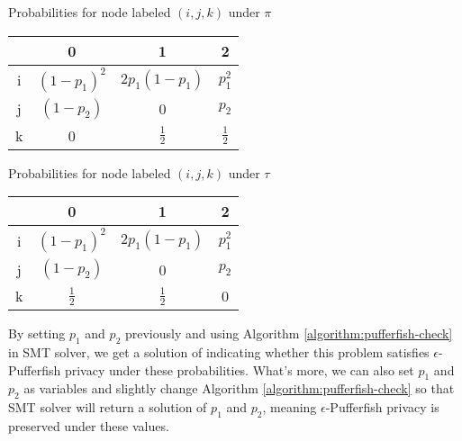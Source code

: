 \begin{minipage}{\textwidth}
\begin{minipage}[t]{0.4\textwidth}
 \centering
  \makeatletter{}\makeatother\caption{Probabilities for node labeled $(i,j,k)$ under $\pi$ }
  \label{table:pi}
   \begin{tabular}{c|ccc}
& 0 & 1 & 2 \\
      \hline
      i
      & $(1-p_1)^2$
      & $2p_1(1-p_1)$
      & $p_1^2$
      \\
      j
      & $(1-p_2)$
      & 0
      & $p_2$
      \\
      k
      & 0
      & $\frac{1}{2}$
      & $\frac{1}{2}$
\end{tabular}
\end{minipage}
\begin{minipage}[t]{0.2\textwidth}
\centering
\space
\end{minipage}
\begin{minipage}[t]{0.4\textwidth}
\centering
  \makeatletter{}\makeatother\caption{Probabilities for node labeled $(i,j,k)$ under $\tau$ }
  \label{table:tau}

   \begin{tabular}{c|ccc}
& 0 & 1 & 2 \\
      \hline
      i
      & $(1-p_1)^2$
      & $2p_1(1-p_1)$
      & $p_1^2$
      \\
      j
      & $(1-p_2)$
      & 0
      & $p_2$
      \\
      k
      & $\frac{1}{2}$
      & $\frac{1}{2}$
      & 0
\end{tabular}
\end{minipage}
\end{minipage}

By setting $p_1$ and $p_2$ previously and using Algorithm \ref{algorithm:pufferfish-check} in SMT solver, we get a solution
of indicating whether this problem satisfies $\epsilon$-Pufferfish privacy under these probabilities.
What's more, we can also set $p_1$ and $p_2$ as variables and slightly change Algorithm \ref{algorithm:pufferfish-check}
so that SMT solver will return a solution of $p_1$ and $p_2$, meaning $\epsilon$-Pufferfish privacy
is preserved under these values.

